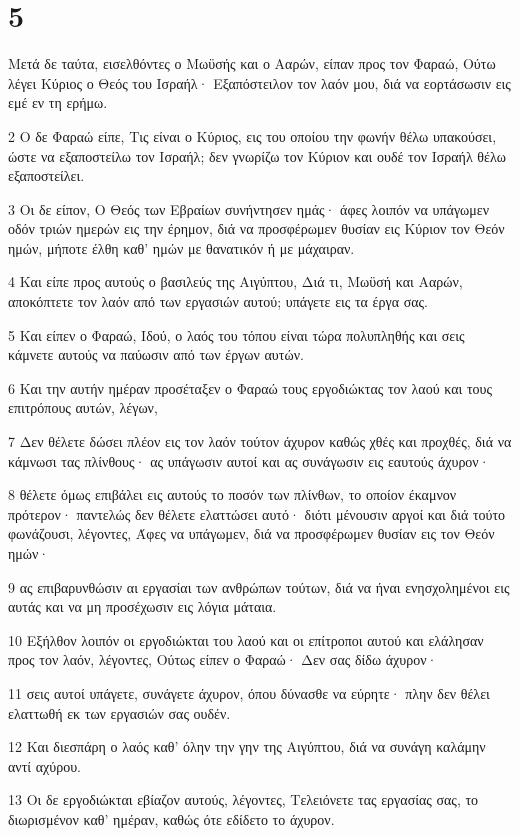 \chapter{5}

\par Μετά δε ταύτα, εισελθόντες ο Μωϋσής και ο Ααρών, είπαν προς τον Φαραώ, Ούτω λέγει Κύριος ο Θεός του Ισραήλ· Εξαπόστειλον τον λαόν μου, διά να εορτάσωσιν εις εμέ εν τη ερήμω.
\par 2 Ο δε Φαραώ είπε, Τις είναι ο Κύριος, εις του οποίου την φωνήν θέλω υπακούσει, ώστε να εξαποστείλω τον Ισραήλ; δεν γνωρίζω τον Κύριον και ουδέ τον Ισραήλ θέλω εξαποστείλει.
\par 3 Οι δε είπον, Ο Θεός των Εβραίων συνήντησεν ημάς· άφες λοιπόν να υπάγωμεν οδόν τριών ημερών εις την έρημον, διά να προσφέρωμεν θυσίαν εις Κύριον τον Θεόν ημών, μήποτε έλθη καθ' ημών με θανατικόν ή με μάχαιραν.
\par 4 Και είπε προς αυτούς ο βασιλεύς της Αιγύπτου, Διά τι, Μωϋσή και Ααρών, αποκόπτετε τον λαόν από των εργασιών αυτού; υπάγετε εις τα έργα σας.
\par 5 Και είπεν ο Φαραώ, Ιδού, ο λαός του τόπου είναι τώρα πολυπληθής και σεις κάμνετε αυτούς να παύωσιν από των έργων αυτών.
\par 6 Και την αυτήν ημέραν προσέταξεν ο Φαραώ τους εργοδιώκτας τον λαού και τους επιτρόπους αυτών, λέγων,
\par 7 Δεν θέλετε δώσει πλέον εις τον λαόν τούτον άχυρον καθώς χθές και προχθές, διά να κάμνωσι τας πλίνθους· ας υπάγωσιν αυτοί και ας συνάγωσιν εις εαυτούς άχυρον·
\par 8 θέλετε όμως επιβάλει εις αυτούς το ποσόν των πλίνθων, το οποίον έκαμνον πρότερον· παντελώς δεν θέλετε ελαττώσει αυτό· διότι μένουσιν αργοί και διά τούτο φωνάζουσι, λέγοντες, Άφες να υπάγωμεν, διά να προσφέρωμεν θυσίαν εις τον Θεόν ημών·
\par 9 ας επιβαρυνθώσιν αι εργασίαι των ανθρώπων τούτων, διά να ήναι ενησχολημένοι εις αυτάς και να μη προσέχωσιν εις λόγια μάταια.
\par 10 Εξήλθον λοιπόν οι εργοδιώκται του λαού και οι επίτροποι αυτού και ελάλησαν προς τον λαόν, λέγοντες, Ούτως είπεν ο Φαραώ· Δεν σας δίδω άχυρον·
\par 11 σεις αυτοί υπάγετε, συνάγετε άχυρον, όπου δύνασθε να εύρητε· πλην δεν θέλει ελαττωθή εκ των εργασιών σας ουδέν.
\par 12 Και διεσπάρη ο λαός καθ' όλην την γην της Αιγύπτου, διά να συνάγη καλάμην αντί αχύρου.
\par 13 Οι δε εργοδιώκται εβίαζον αυτούς, λέγοντες, Τελειόνετε τας εργασίας σας, το διωρισμένον καθ' ημέραν, καθώς ότε εδίδετο το άχυρον.
